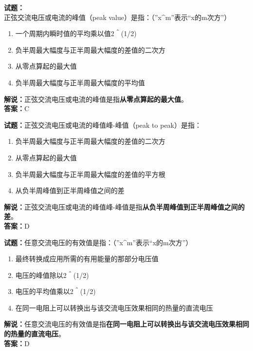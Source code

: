 \documentclass{ctexbook}
\begin{document}
\vspace{1em}

\textbf{试题：}正弦交流电压或电流的峰值（peak value）是指：（”x\string^m”表示“x的m次方”）
\begin{enumerate}[leftmargin=3em]
  \item 一个周期内瞬时值的平均乘以值2＾(1/2)
  \item 负半周最大幅度与正半周最大幅度的差值的二次方
  \item 从零点算起的最大值
  \item 负半周最大幅度与正半周最大幅度的平均值
\end{enumerate}
\noindent\textbf{解说：}正弦交流电压或电流的峰值是指\textbf{从零点算起的最大值}。\\\noindent\textbf{答案：}C

\vspace{1em}

\textbf{试题：}正弦交流电压或电流的峰值峰-峰值（peak to peak）是指：
\begin{enumerate}[leftmargin=3em]
  \item 负半周最大幅度与正半周最大幅度的差值的二次方
  \item 从零点算起的最大值
  \item 负半周最大幅度与正半周最大幅度的差值的平方根
  \item 从负半周峰值到正半周峰值之间的差
\end{enumerate}
\noindent\textbf{解说：}正弦交流电压或电流的峰值峰-峰值是指\textbf{从负半周峰值到正半周峰值之间的差}。\\\noindent\textbf{答案：}D

\vspace{1em}

\textbf{试题：}任意交流电压的有效值是指：（”x\string^m”表示“x的m次方”）
\begin{enumerate}[leftmargin=3em]
  \item 最终转换成应用所需的有用能量的那部分电压值
  \item 电压的峰值除以2＾(1/2)
  \item 电压的平均值乘以2＾(1/2)
  \item 在同一电阻上可以转换出与该交流电压效果相同的热量的直流电压
\end{enumerate}
\noindent\textbf{解说：}任意交流电压的有效值是指\textbf{在同一电阻上可以转换出与该交流电压效果相同的热量的直流电压}。\\\noindent\textbf{答案：}D

\vspace{1em}
\end{document}

